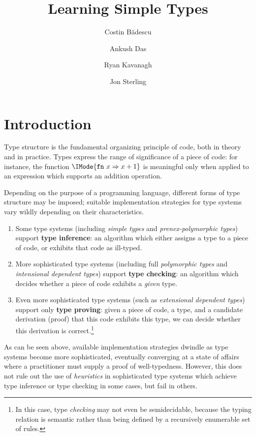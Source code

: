 \documentclass[twocolumn,9pt]{article}
\title{Learning Simple Types}
\author{Costin B\u{a}descu\and Ankush Das\and Ryan Kavanagh\and Jon Sterling}
\date{}
\theoremstyle{definition}
\theoremstyle{remark}
\numberwithin{equation}{section}
\newcommand\Fn[2]{\mathtt{fn}\ {#1}\Rightarrow{#2}}
\begin{document}
\maketitle

\section{Introduction}

Type structure is the fundamental organizing principle of code, both
in theory and in practice. Types express the range of significance of
a piece of code: for instance, the function $\IMode{\Fn{x}{x+1}}$ is
meaningful only when applied to an expression which supports an
addition operation.

Depending on the purpose of a programming language, different forms of
type structure may be imposed; suitable implementation strategies for
type systems vary wildly depending on their characteristics.

\begin{enumerate}
\item Some type systems (including \emph{simple types} and
  \emph{prenex-polymorphic types}) support \textbf{type inference}: an
  algorithm which either assigns a type to a piece of code, or
  exhibits that code as ill-typed.
\item More sophisticated type systems (including full
  \emph{polymorphic types} and \emph{intensional dependent types})
  support \textbf{type checking}: an algorithm which decides whether a
  piece of code exhibits a \emph{given} type.
\item Even more sophisticated type systems (such as \emph{extensional
    dependent types}) support only \textbf{type proving}: given a
  piece of code, a type, and a candidate derivation (proof) that this
  code exhibits this type, we can decide whether this derivation is
  correct.\footnote{In this case, type \emph{checking} may not even be
    semidecidable, because the typing relation is semantic rather than
    being defined by a recursively enumerable set of rules.}
\end{enumerate}

As can be seen above, available implementation strategies dwindle as
type systems become more sophisticated, eventually converging at a
state of affairs where a practitioner must supply a proof of
well-typedness. However, this does not rule out the use of
\emph{heuristics} in sophisticated type systems which achieve type
inference or type checking in some cases, but fail in others.
\end{document}
